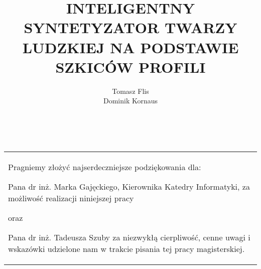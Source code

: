 \documentclass[12pt,oneside]{article}
\title{INTELIGENTNY SYNTETYZATOR TWARZY LUDZKIEJ NA PODSTAWIE SZKICÓW
    PROFILI}
\author{Tomasz Flis\\Dominik Kornaus}
\institute{Wydzial Elektrotechniki, Automatyki, Informatyki i Elektroniki}
\begin{document}
    \renewcommand{\figurename}{\bf Ilustracja}    %
    \renewcommand{\tablename}{Tab.}     %
    \pagestyle{fancy}
    \thispagestyle{empty}               %
    \titlepage                     %

    \newpage
    ~   %
    \vfill
    {\sffamily
    \begin{flushright}
        \begin{tabular}[c]{p{9cm}}
        \centering
        \noindent
         Pragniemy złożyć najserdeczniejsze podziękowania dla:
         
         Pana dr inż. Marka Gajęckiego, Kierownika Katedry Informatyki, za
         możliwość realizacji niniejszej pracy
         
         oraz
         
         Pana dr inż. Tadeusza Szuby za niezwykłą
         cierpliwość, cenne uwagi i wskazówki udzielone
         nam w trakcie pisania tej pracy magisterskiej.
        \end{tabular}
    \end{flushright}
    }
    \vskip0.5in
    \thispagestyle{empty}
    \newpage

    \thispagestyle{empty}
    \renewcommand{\thepage}{\arabic{page}}
    \renewcommand{\cftbeforesecskip}{8pt}
    \renewcommand{\cftsecafterpnum}{\vskip 8pt}
    \renewcommand{\cftparskip}{3pt}
    \renewcommand{\cfttoctitlefont}{\Large\bfseries\sffamily}
    \renewcommand{\cftsecfont}{\bfseries\sffamily}
    \renewcommand{\cftsubsecfont}{\sffamily}
    \renewcommand{\cftsubsubsecfont}{\sffamily}
    \renewcommand{\cftparafont}{\sffamily}
	\hypersetup{linkcolor=black}
    \begin{spacing}{0.8}
    \tableofcontents    %
    \end{spacing}
    \newpage

	\thispagestyle{empty}
    
    \newpage

\end{document}
